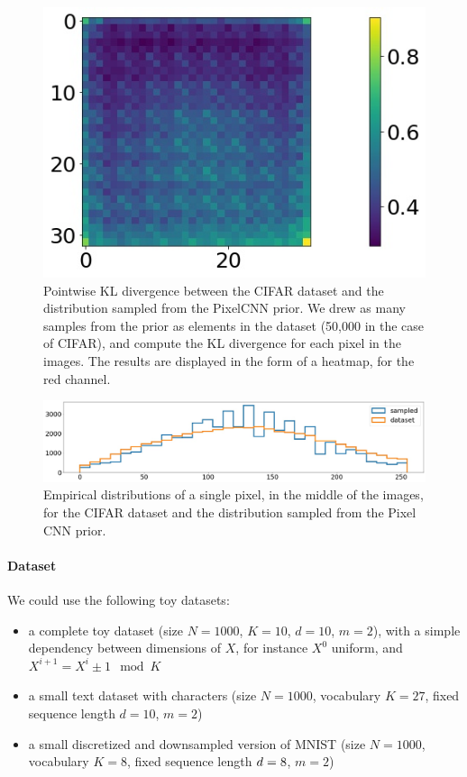 \documentclass{article}
\begin{document}
\begin{figure}[htpb]
	\centering
	\includegraphics[width=0.6\linewidth]{images/compare_distro_kl_pixelcnn.jpg}
	\caption{Pointwise KL divergence between the CIFAR dataset and the distribution sampled from the PixelCNN prior.
We drew as many samples from the prior as elements in the dataset (50,000 in the case of CIFAR), and compute the KL divergence for each pixel in the images.
The results are displayed in the form of a heatmap, for the red channel.}
	\label{fig:compare_distro_kl_pixelcnn}
\end{figure}

\begin{figure}[htpb]
	\centering
	\includegraphics[width=\linewidth]{images/compare_distro_hist_pixelcnn.jpg}
	\caption{Empirical distributions of a single pixel, in the middle of the images, for the CIFAR dataset and the distribution sampled from the Pixel CNN prior.}
	\label{fig:compare_distro_hist_pixelcnn}
\end{figure}

\paragraph{Dataset} We could use the following toy datasets:

\begin{itemize}
	\item a complete toy dataset (size $N=1000$, $K=10$, $d=10$, $m=2$), with a simple dependency between dimensions of $X$, for instance $X^0$ uniform, and $X^{i+1} = X^i \pm 1 \mod K$
	\item a small text dataset with characters (size $N=1000$, vocabulary $K=27$, fixed sequence length $d=10$, $m=2$)
	\item a small discretized and downsampled version of MNIST (size $N=1000$, vocabulary $K=8$, fixed sequence length $d=8 \time 8$, $m=2$)
\end{itemize}
\end{document}
